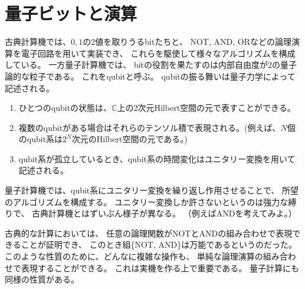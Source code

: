 \documentclass[]{ltjsarticle}
\newcommand{\complex}{\mathbb{C}}
\begin{document}
\section{量子ビットと演算}
古典計算機では、$0,1$の2値を取りうるbitたちと、
NOT, AND, ORなどの論理演算を電子回路を用いて実装でき、
これらを駆使して様々なアルゴリズムを構成している。
一方量子計算機では、
bitの役割を果たすのは内部自由度が2の量子論的な粒子である。
これをqubitと呼ぶ。
qubitの振る舞いは量子力学によって記述される。
\begin{enumerate}
    \item ひとつのqubitの状態は、$\complex$上の2次元Hilbert空間の元で表すことができる。
    \item 複数のqubitがある場合はそれらのテンソル積で表現される。(例えば、$N$個のqubit系は$2^N$次元のHilbert空間の元である。)
    \item qubit系が孤立しているとき、qubit系の時間変化はユニタリー変換を用いて記述される。
\end{enumerate}
量子計算機では、qubit系にユニタリー変換を繰り返し作用させることで、
所望のアルゴリズムを構成する。
ユニタリー変換しか許さないというのは強力な縛りで、
古典計算機とはずいぶん様子が異なる。
（例えばANDを考えてみよ。）

古典的な計算においては、
任意の論理関数がNOTとANDの組み合わせで表現できることが証明でき、
このとき組\{NOT, AND\}は万能であるというのだった。
このような性質のために、どんなに複雑な操作も、
単純な論理演算の組み合わせで表現することができる。
これは実機を作る上で重要である。
量子計算にも同様の性質がある。
\end{document}
